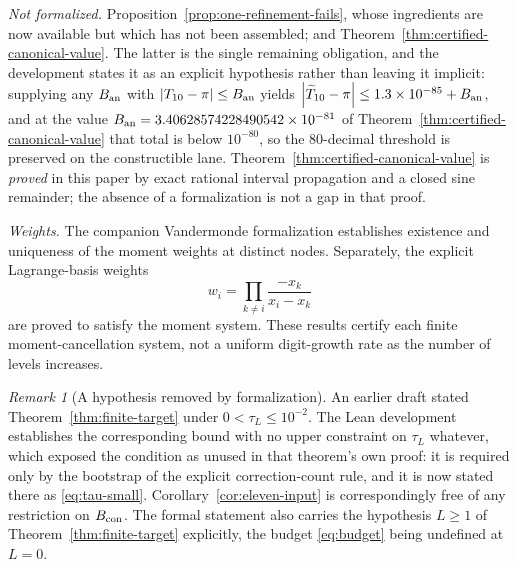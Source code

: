 \documentclass[12pt]{article}
\theoremstyle{definition}
\theoremstyle{remark}
\newtheorem{remark}[theorem]{Remark}
\newcommand{\abs}[1]{\left|#1\right|}
\begin{document}
\emph{Not formalized.}  Proposition~\ref{prop:one-refinement-fails}, whose
ingredients are now available but which has not been assembled; and
Theorem~\ref{thm:certified-canonical-value}.  The latter is the single remaining
obligation, and the development states it as an explicit hypothesis rather than
leaving it implicit: supplying any $B_{\rm an}$ with
$\abs{T_{10}-\pi}\le B_{\rm an}$ yields
$\abs{\widetilde T_{10}-\pi}\le1.3\times10^{-85}+B_{\rm an}$, and at the value
$B_{\rm an}=3.40628574228490542\times10^{-81}$ of
Theorem~\ref{thm:certified-canonical-value} that total is below $10^{-80}$, so
the $80$-decimal threshold is preserved on the constructible lane.
Theorem~\ref{thm:certified-canonical-value} is \emph{proved} in this paper by
exact rational interval propagation and a closed sine remainder; the absence of
a formalization is not a gap in that proof.

\emph{Weights.} The companion Vandermonde formalization establishes existence and
uniqueness of the moment weights at distinct nodes. Separately, the explicit
Lagrange-basis weights
\[
w_i=\prod_{k\ne i}\frac{-x_k}{x_i-x_k}
\]
are proved to satisfy the moment system. These results certify each finite
moment-cancellation system, not a uniform digit-growth rate as the number of
levels increases.

\begin{remark}[A hypothesis removed by formalization]
\label{rem:lean-hypothesis}
An earlier draft stated Theorem~\ref{thm:finite-target} under
$0<\tau_L\le10^{-2}$.  The Lean development establishes the corresponding bound
with no upper constraint on $\tau_L$ whatever, which exposed the condition as
unused in that theorem's own proof: it is required only by the bootstrap of the
explicit correction-count rule, and it is now stated there as
\eqref{eq:tau-small}.  Corollary~\ref{cor:eleven-input} is correspondingly free
of any restriction on $B_{\rm con}$.  The formal statement also carries the
hypothesis $L\ge1$ of Theorem~\ref{thm:finite-target} explicitly, the budget
\eqref{eq:budget} being undefined at $L=0$.
\end{remark}
\end{document}
